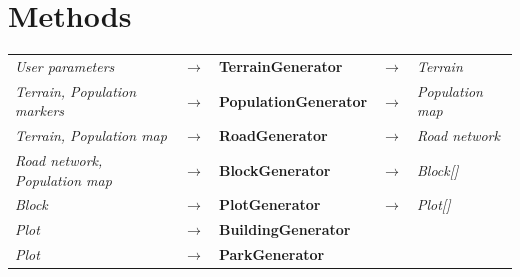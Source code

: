 \section{Methods}
\begin{center}
  \begin{table}[H]
    \begin{tabular}{lllll}
      \textit{User parameters}              & $\rightarrow$ & \textbf{TerrainGenerator}    & $\rightarrow$ & \textit{Terrain}        \\
      \textit{Terrain, Population markers}  & $\rightarrow$ & \textbf{PopulationGenerator} & $\rightarrow$ & \textit{Population map} \\
      \textit{Terrain, Population map}      & $\rightarrow$ & \textbf{RoadGenerator}       & $\rightarrow$ & \textit{Road network}   \\
      \textit{Road network, Population map} & $\rightarrow$ & \textbf{BlockGenerator}      & $\rightarrow$ & \textit{Block{[}{]}}    \\
      \textit{Block}                        & $\rightarrow$ & \textbf{PlotGenerator}       & $\rightarrow$ & \textit{Plot{[}{]}}     \\
      \textit{Plot}                         & $\rightarrow$ & \textbf{BuildingGenerator}   &               &                         \\
      \textit{Plot}                         & $\rightarrow$ & \textbf{ParkGenerator}       &               &                        
      \end{tabular}
    \end{table}
\end{center}

